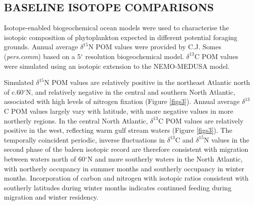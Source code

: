 \documentclass[a4paper,12pt]{article}
\begin{document}
\subsection*{BASELINE ISOTOPE COMPARISONS}
Isotope-enabled biogeochemical ocean models\cite{magozzi2017using,schmittner2016complementary} were used to characterise the isotopic composition of phytoplankton expected in different potential foraging grounds. 
Annual average $\delta^{15}$N POM values were provided by C.J. Somes (\textit{pers.comm}) based on a 5$^{\circ}$ resolution biogeochemical model. 
$\delta^{13}$C POM values were simulated using an isotopic extension to the NEMO-MEDUSA model\cite{magozzi2017using}.
 
Simulated $\delta^{15}$N POM values are relatively positive in the northeast Atlantic north of c.60$^{\circ}$N, and relatively negative in the central and southern North Atlantic, associated with high levels of nitrogen fixation (Figure \ref{figs3}). 
Annual average $\delta^{13}$C POM values largely vary with latitude, with more negative values in more northerly regions. 
In the central North Atlantic, $\delta^{13}$C POM values are relatively positive in the west, reflecting warm gulf stream waters (Figure \ref{figs3}). 
The temporally coincident periodic, inverse fluctuations in $\delta^{13}$C and $\delta^{15}$N values in the second phase of the baleen isotopic record are therefore consistent with migration between waters north of 60$^{\circ}$N and more southerly waters in the North Atlantic, with northerly occupancy in summer months and southerly occupancy in winter months. 
Incorporation of carbon and nitrogen with isotopic ratios consistent with southerly latitudes during winter months indicates continued feeding during migration and winter residency.
 
\end{document}
